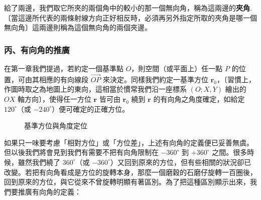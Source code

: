 給了兩邊，我們取它所夾的兩個角中的較小的那一個無向角，稱為這兩邊的\textbf{夾角}.〔當這邊所代表的兩條射線方向正好相反時，必須再另外指定所取的夾角是哪一個無向角〕這兩邊則稱為這個無向角的兩個夾邊。

\subsubsection*{丙、有向角的推廣}

在第一章我們提過，若約定一個基準點 $O$，則空間（或平面上）任一點 $P$ 的位置，可由其相應的有向線段 $\vec{OP}$ 來決定。同樣我們約定一基準方位 $\mathbf{r}_0$，〔習慣上，作圖時取之為地圖上的東向，這相當於慣常我們沿一座標系 $(O; X, Y)$ 繪出的 $OX$ 軸方向〕，使得任一方位 $\mathbf{r}$ 皆可由 $\mathbf{r}_0$ 繞到 $\mathbf{r}$ 的有向角之角度確定，如給定 $120^\circ$（或 $-240^\circ$）便可確定的正確方位。

\begin{figure}[H]
\centering
{}
\caption{基準方位與角度定位}
\label{fig:b3-fig2-6}
\end{figure}

如果只一味要考慮「相對方位」或「方位差」，上述有向角的定義便已妥善無虞。但以後我們將會見到我們有需要不把有向角限制在 $-360^\circ$ 到 $+360^\circ$ 之間。很多時候，雖然我們繞了 $360^\circ$（或 $-360^\circ$）又回到原來的方位，但有些相關的狀況卻已改變。若把有向角看成是方位的旋轉本身，那麼一個磨穀的石磨仔旋轉一百圈後，回到原來的方位，與它從來不曾旋轉明顯有著區別。為了把這種區別顯示出來，我們要推廣有向角的定義：

